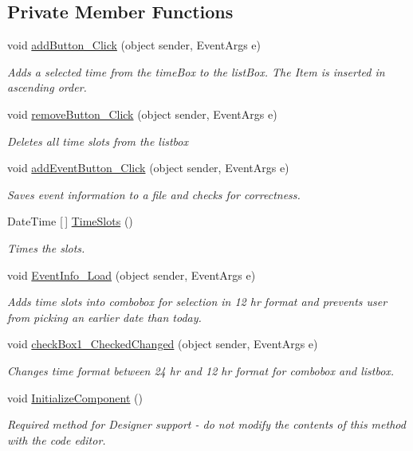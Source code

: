 \subsection*{Private Member Functions}
\begin{DoxyCompactItemize}
\item 
void \hyperlink{classProject1_1_1EventInfo_a7f1582debc3b36848116513dbefb690c}{add\+Button\+\_\+\+Click} (object sender, Event\+Args e)
\begin{DoxyCompactList}\small\item\em Adds a selected time from the time\+Box to the list\+Box. The Item is inserted in ascending order. \end{DoxyCompactList}\item 
void \hyperlink{classProject1_1_1EventInfo_aaa2e7fde2f469c6769b8099941bd66d0}{remove\+Button\+\_\+\+Click} (object sender, Event\+Args e)
\begin{DoxyCompactList}\small\item\em Deletes all time slots from the listbox \end{DoxyCompactList}\item 
void \hyperlink{classProject1_1_1EventInfo_a3b0662eb1959327307b4e4992123378f}{add\+Event\+Button\+\_\+\+Click} (object sender, Event\+Args e)
\begin{DoxyCompactList}\small\item\em Saves event information to a file and checks for correctness. \end{DoxyCompactList}\item 
Date\+Time \mbox{[}$\,$\mbox{]} \hyperlink{classProject1_1_1EventInfo_a12da689af1a5f87c244d014247cf4f73}{Time\+Slots} ()
\begin{DoxyCompactList}\small\item\em Times the slots. \end{DoxyCompactList}\item 
void \hyperlink{classProject1_1_1EventInfo_a3bf5e88c899ab15fbe76bdccc1a72e9d}{Event\+Info\+\_\+\+Load} (object sender, Event\+Args e)
\begin{DoxyCompactList}\small\item\em Adds time slots into combobox for selection in 12 hr format and prevents user from picking an earlier date than today. \end{DoxyCompactList}\item 
void \hyperlink{classProject1_1_1EventInfo_a64e3ce2cb6745b461022d2a968cad153}{check\+Box1\+\_\+\+Checked\+Changed} (object sender, Event\+Args e)
\begin{DoxyCompactList}\small\item\em Changes time format between 24 hr and 12 hr format for combobox and listbox. \end{DoxyCompactList}\item 
void \hyperlink{classProject1_1_1EventInfo_ad8918624e8ae88b80277a9c1b913b1c3}{Initialize\+Component} ()
\begin{DoxyCompactList}\small\item\em Required method for Designer support -\/ do not modify the contents of this method with the code editor. \end{DoxyCompactList}\end{DoxyCompactItemize}
